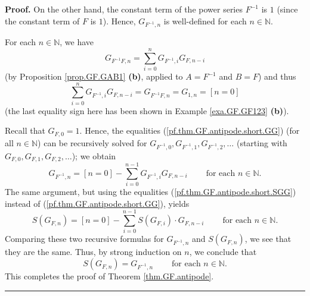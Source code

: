 \documentclass[numbers=enddot,12pt,final,onecolumn,notitlepage]{scrartcl}%
\theoremstyle{definition}
\newenvironment{proof}[1][Proof]{\noindent\textbf{#1.} }{\ \rule{0.5em}{0.5em}}
\let\sumnonlimits\sum
\renewcommand{\sum}{\sumnonlimits\limits}
\newenvironment{vershort}{}{}
\begin{document}
\begin{vershort}
\begin{proof}
On the other hand, the constant term of the power series $F^{-1}$ is $1$
(since the constant term of $F$ is $1$). Hence, $G_{F^{-1},n}$ is well-defined
for each $n\in\mathbb{N}$.

For each $n\in\mathbb{N}$, we have%
\[
G_{F^{-1}F,n}=\sum_{i=0}^{n}G_{F^{-1},i}G_{F,n-i}%
\]
(by Proposition \ref{prop.GF.GAB1} \textbf{(b)}, applied to $A=F^{-1}$ and
$B=F$) and thus%
\begin{equation}
\sum_{i=0}^{n}G_{F^{-1},i}G_{F,n-i}=G_{F^{-1}F,n}=G_{1,n}=\left[  n=0\right]
\label{pf.thm.GF.antipode.short.GG}%
\end{equation}
(the last equality sign here has been shown in Example \ref{exa.GF.GF123}
\textbf{(b)}).

Recall that $G_{F,0}=1$. Hence, the equalities
(\ref{pf.thm.GF.antipode.short.GG}) (for all $n\in\mathbb{N}$) can be
recursively solved for $G_{F^{-1},0},G_{F^{-1},1},G_{F^{-1},2},\ldots$
(starting with $G_{F,0},G_{F,1},G_{F,2},\ldots$); we obtain%
\[
G_{F^{-1},n}=\left[  n=0\right]  -\sum_{i=0}^{n-1}G_{F^{-1},i}G_{F,n-i}%
\ \ \ \ \ \ \ \ \ \ \text{for each }n\in\mathbb{N}.
\]
The same argument, but using the equalities
(\ref{pf.thm.GF.antipode.short.SGG}) instead of
(\ref{pf.thm.GF.antipode.short.GG}), yields%
\[
S\left(  G_{F,n}\right)  =\left[  n=0\right]  -\sum_{i=0}^{n-1}S\left(
G_{F,i}\right)  \cdot G_{F,n-i}\ \ \ \ \ \ \ \ \ \ \text{for each }%
n\in\mathbb{N}.
\]
Comparing these two recursive formulas for $G_{F^{-1},n}$ and $S\left(
G_{F,n}\right)  $, we see that they are the same. Thus, by strong induction on
$n$, we conclude that%
\[
S\left(  G_{F,n}\right)  =G_{F^{-1},n}\ \ \ \ \ \ \ \ \ \ \text{for each }%
n\in\mathbb{N}\text{.}%
\]
This completes the proof of Theorem \ref{thm.GF.antipode}.
\end{proof}
\end{vershort}
\end{document}
